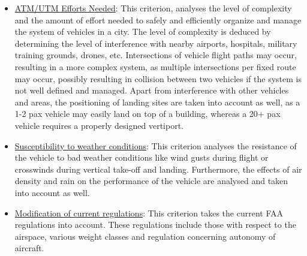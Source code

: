 \begin{itemize}
    \item \underline{ATM/UTM Efforts Needed}: This criterion, analyses the level of complexity and the amount of effort needed to safely and efficiently organize and manage the system of vehicles in a city. The level of complexity is deduced by determining the level of interference with nearby airports, hospitals, military training grounds, drones, etc. Intersections of vehicle flight paths may occur, resulting in a more complex system,  as multiple intersections per fixed route may occur, possibly resulting in collision between two vehicles if the system is not well defined and managed. Apart from interference with other vehicles and areas, the positioning of landing sites are taken into account as well, as a 1-2 pax vehicle may easily land on top of a building, whereas a 20+ pax vehicle requires a properly designed vertiport.
    \item \underline{Susceptibility to weather conditions}: This criterion analyses the resistance of the vehicle to bad weather conditions like wind gusts during flight or crosswinds during vertical take-off and landing. Furthermore, the effects of air density and rain on the performance of the vehicle are analysed and taken into account as well. 
    \item \underline{Modification of current regulations}: This criterion takes the current FAA regulations into account. These regulations include those with respect to the airspace, various weight classes and regulation concerning autonomy of aircraft. 

  
\end{itemize}


    
  








    
